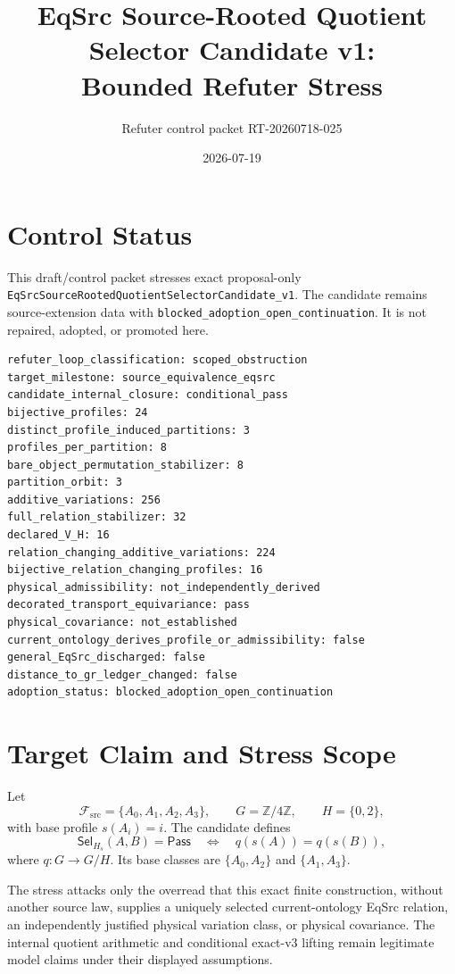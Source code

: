 \documentclass[11pt]{article}
\title{EqSrc Source-Rooted Quotient Selector Candidate v1:\\
Bounded Refuter Stress}
\author{Refuter control packet RT-20260718-025}
\date{2026-07-19}
\newcommand{\Pass}{\mathsf{Pass}}
\newcommand{\Fsrc}{\mathcal F_{\mathrm{src}}}
\newcommand{\Sel}{\mathsf{Sel}_{H}}
\begin{document}
\maketitle

\section{Control Status}

This draft/control packet stresses exact proposal-only
\texttt{EqSrcSourceRootedQuotientSelectorCandidate\_v1}. The candidate remains
source-extension data with
\texttt{blocked\_adoption\_open\_continuation}. It is not repaired, adopted,
or promoted here.

\begin{verbatim}
refuter_loop_classification: scoped_obstruction
target_milestone: source_equivalence_eqsrc
candidate_internal_closure: conditional_pass
bijective_profiles: 24
distinct_profile_induced_partitions: 3
profiles_per_partition: 8
bare_object_permutation_stabilizer: 8
partition_orbit: 3
additive_variations: 256
full_relation_stabilizer: 32
declared_V_H: 16
relation_changing_additive_variations: 224
bijective_relation_changing_profiles: 16
physical_admissibility: not_independently_derived
decorated_transport_equivariance: pass
physical_covariance: not_established
current_ontology_derives_profile_or_admissibility: false
general_EqSrc_discharged: false
distance_to_gr_ledger_changed: false
adoption_status: blocked_adoption_open_continuation
\end{verbatim}

\section{Target Claim and Stress Scope}

Let
\[
 \Fsrc=\{A_0,A_1,A_2,A_3\},\qquad
 G=\mathbb Z/4\mathbb Z,\qquad H=\{0,2\},
\]
with base profile \(s(A_i)=i\). The candidate defines
\[
 \Sel_s(A,B)=\Pass
 \quad\Longleftrightarrow\quad
 q(s(A))=q(s(B)),
\]
where \(q:G\to G/H\). Its base classes are
\(\{A_0,A_2\}\) and \(\{A_1,A_3\}\).

The stress attacks only the overread that this exact finite construction,
without another source law, supplies a uniquely selected current-ontology
EqSrc relation, an independently justified physical variation class, or
physical covariance. The internal quotient arithmetic and conditional
exact-v3 lifting remain legitimate model claims under their displayed
assumptions.
\end{document}
